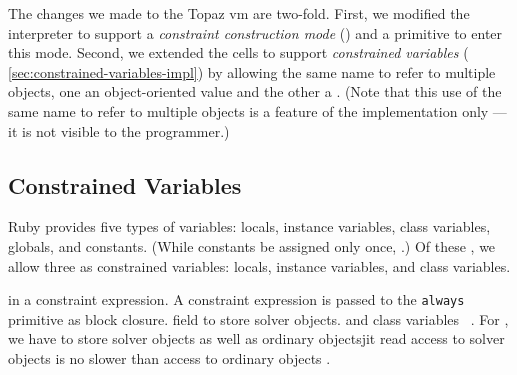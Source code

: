 The changes we made to the Topaz \ac{vm} are two-fold.  First, we
modified the interpreter to support a \emph{constraint construction
  mode} () and a
primitive to enter this mode.  Second, we extended the cells to
support \emph{constrained variables} (\cf
{\autoref{sec:constrained-variables-impl}}) by allowing the same name
to refer to multiple objects, one an object-oriented value and the
other a \DIFdelbegin {}\DIFdelend \DIFaddbegin \emph{}\DIFaddend .  (Note that this use of the same name to refer
to multiple objects is a feature of the implementation only --- it is
not visible to the programmer.)

\subsection{Constrained Variables}
\label{sec:constrained-variables-impl}
Ruby provides five types of variables: locals, instance variables,
class variables, globals, and constants.  (While constants \DIFdelbegin {}\DIFdelend \DIFaddbegin {}\DIFaddend be
assigned only once, \DIFdelbegin {}\DIFdelend \DIFaddbegin {}\DIFaddend .)  Of these \DIFaddbegin {}\DIFaddend , we allow three
as constrained variables: locals, instance variables, and class
variables.

\DIFdelbegin {}\DIFdelend \DIFaddbegin {}\DIFaddend in a
constraint expression. A constraint expression is passed to the
\lstinline{always} primitive as \DIFdelbegin {}\DIFdelend \DIFaddbegin {}\DIFaddend block closure. \DIFdelbegin {}\DIFdelend \DIFaddbegin {}\toolname {}\DIFaddend field to store solver objects. \DIFdelbegin {}\DIFdelend \DIFaddbegin {}\DIFaddend and class variables \DIFdelbegin {}\DIFdelend \DIFaddbegin {}\DIFaddend ~\cite{chambers1989efficient}. For \toolname, we have \DIFdelbegin {}\DIFdelend \DIFaddbegin {}\DIFaddend to store solver objects as well as ordinary objects\DIFdelbegin {}\DIFdelend \DIFaddbegin {}\ac{jit} \DIFaddend read access to solver objects is no
slower than access to ordinary objects\DIFdelbegin {}%
\DIFdelend .

